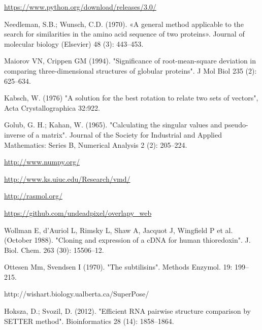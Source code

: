 \documentclass{article}
\begin{document}
\begin{thebibliography}{8}
\href{https://www.python.org/download/releases/3.0/}{https://www.python.org/download/releases/3.0/}

Needleman, S.B.; Wunsch, C.D. (1970). «A general method applicable to the search for similarities in the amino acid sequence of two proteins». Journal of molecular biology (Elsevier) 48 (3): 443–453.

Maiorov VN, Crippen GM (1994). "Significance of root-mean-square deviation in comparing three-dimensional structures of globular proteins". J Mol Biol 235 (2): 625–634.

Kabsch, W. (1976) "A solution for the best rotation to relate two sets of vectors", Acta Crystallographica 32:922.

Golub, G. H.; Kahan, W. (1965). "Calculating the singular values and pseudo-inverse of a matrix". Journal of the Society for Industrial and Applied Mathematics: Series B, Numerical Analysis 2 (2): 205–224. 

\href{http://www.numpy.org/}{http://www.numpy.org/}

\href{http://www.ks.uiuc.edu/Research/vmd/}{http://www.ks.uiuc.edu/Research/vmd/}

\href{http://rasmol.org/}{http://rasmol.org/}

\href{https://github.com/undeadpixel/overlapy_web}{https://github.com/undeadpixel/overlapy\_web}

Wollman E, d'Auriol L, Rimsky L, Shaw A, Jacquot J, Wingfield P et al. (October 1988). "Cloning and expression of a cDNA for human thioredoxin". J. Biol. Chem. 263 (30): 15506–12.

Ottesen Mm, Svendsen I (1970). "The subtilisins". Methods Enzymol. 19: 199–215.

http://wishart.biology.ualberta.ca/SuperPose/

Hoksza, D.; Svozil, D. (2012). "Efficient RNA pairwise structure comparison by SETTER method". Bioinformatics 28 (14): 1858–1864.

\end{thebibliography}
\end{document}
